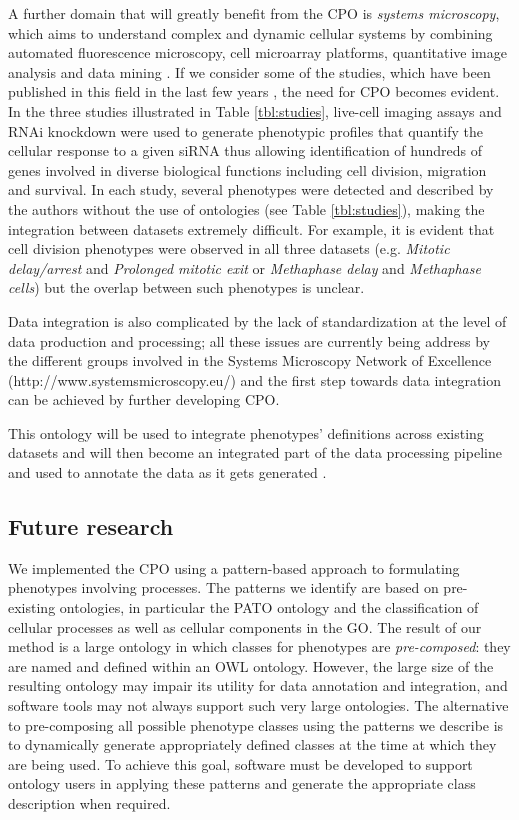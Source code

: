 \documentclass[12pt]{article}
\renewcommand{\cite}{\citep}
\begin{document}
A further domain that will greatly benefit from the CPO is {\em
  systems microscopy}, which aims to understand complex and dynamic
cellular systems by combining automated fluorescence microscopy, cell
microarray platforms, quantitative image analysis and data mining
\cite{Lock2010}.  If we consider some of the studies, which have been
published in this field in the last few years \cite{Neumann2010,
  Schmitz2010, Fuchs2010}, the need for CPO becomes evident.  In the
three studies illustrated in Table \ref{tbl:studies}, live-cell
imaging assays and RNAi knockdown were used to generate phenotypic
profiles that quantify the cellular response to a given siRNA thus
allowing identification of hundreds of genes involved in diverse
biological functions including cell division, migration and survival.
In each study, several phenotypes were detected and described by the
authors without the use of ontologies (see Table \ref{tbl:studies}),
making the integration between datasets extremely difficult. For
example, it is evident that cell division phenotypes were observed in
all three datasets (e.g. {\em Mitotic delay/arrest} and {\em Prolonged
  mitotic exit} or {\em Methaphase delay} and {\em Methaphase cells})
but the overlap between such phenotypes is unclear.

Data integration is also complicated by the lack of standardization at
the level of data production and processing; all these issues are
currently being address by the different groups involved in the
Systems Microscopy Network of Excellence
(http://www.systemsmicroscopy.eu/) and the first step towards data
integration can be achieved by further developing CPO.

This ontology will be used to integrate phenotypes' definitions across
existing datasets and will then become an integrated part of the data
processing pipeline and used to annotate the data as it gets generated
\cite{Conrad2011}.

\subsection{Future research}
We implemented the CPO using a pattern-based approach to formulating
phenotypes involving processes. The patterns we identify are based on
pre-existing ontologies, in particular the PATO ontology and the
classification of cellular processes as well as cellular components in
the GO. The result of our method is a large ontology in which classes
for phenotypes are {\em pre-composed}: they are named and defined
within an OWL ontology. However, the large size of the resulting
ontology may impair its utility for data annotation and integration,
and software tools may not always support such very large
ontologies. The alternative to pre-composing all possible phenotype
classes using the patterns we describe is to dynamically generate
appropriately defined classes at the time at which they are being
used. To achieve this goal, software must be developed to support
ontology users in applying these patterns and generate the appropriate
class description when required.
\end{document}
